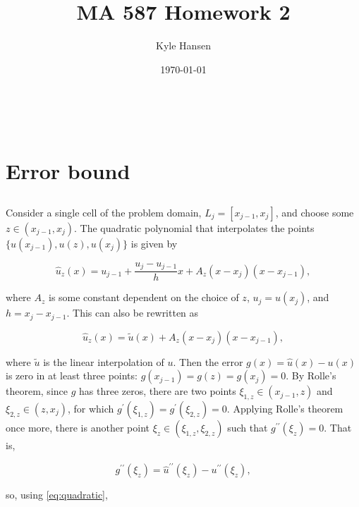 \documentclass{hw-template}
\title{MA 587 Homework 2}
\author{Kyle Hansen}
\date{\today}
\begin{document}
\newcommand{\hn}[1]{\left\| {#1} \right\|_{H^k}}\
\newcommand{\iph}[2]{\left({#1}, {#2}\right)_{H^k}}
\newcommand{\ipl}[2]{\left\langle{#1}, {#2}\right\rangle_{L_2(\Omega)}}
\newcommand{\da}{D^{\alpha}}

\maketitle

\section{Error bound}

\subsection{} Consider a single cell of the problem domain, $L_j = [x_{j-1}, x_j]$, and choose some $z \in (x_{j-1}, x_j)$. The quadratic polynomial that interpolates the points $\{u(x_{j-1}), u(z), u(x_{j})\}$ is given by

\begin{equation} \label{eq:quadratic}
    \hat{u}_z(x) = u_{j-1} + \frac{u_j - u_{j-1}}{h}x + A_z(x-x_j)(x-x_{j-1}),
\end{equation}

where $A_z$ is some constant dependent on the choice of $z$, $u_j = u(x_j)$, and $h = x_j - x_{j-1}$. This can also be rewritten as 

\begin{equation}
    \hat{u}_z(x) = \tilde{u}(x) + A_z(x-x_j)(x-x_{j-1}),
\end{equation}

where $\tilde{u}$ is the linear interpolation of $u$. Then the error $g(x) = \hat{u}(x) - u(x)$ is zero in at least three points: $g(x_{j-1}) = g(z) = g(x_j) = 0$. By Rolle's theorem, since $g$ has three zeros, there are two points $\xi_{1, z} \in (x_{j-1}, z)$ and $\xi_{2, z} \in (z, x_j)$, for which $g^\prime(\xi_{1, z}) = g^\prime(\xi_{2, z}) = 0$. Applying Rolle's theorem once more, there is another point $\xi_{z} \in (\xi_{1, z}, \xi_{2, z})$ such that $g^{\prime\prime}(\xi_z) = 0$. That is, 

\begin{equation}
    g^{\prime\prime}(\xi_z) = \hat{u}^{\prime\prime}(\xi_z) - u^{\prime\prime}(\xi_z), 
\end{equation}

so, using \autoref{eq:quadratic}, 
\end{document}
